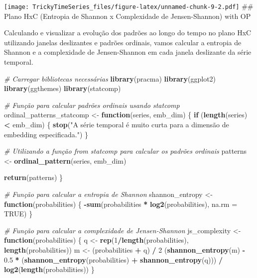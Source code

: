 \documentclass[
]{article}
\newenvironment{Shaded}{\begin{snugshade}}{\end{snugshade}}
\newcommand{\AttributeTok}[1]{\textcolor[rgb]{0.13,0.29,0.53}{#1}}
\newcommand{\CommentTok}[1]{\textcolor[rgb]{0.56,0.35,0.01}{\textit{#1}}}
\newcommand{\ConstantTok}[1]{\textcolor[rgb]{0.56,0.35,0.01}{#1}}
\newcommand{\ControlFlowTok}[1]{\textcolor[rgb]{0.13,0.29,0.53}{\textbf{#1}}}
\newcommand{\DecValTok}[1]{\textcolor[rgb]{0.00,0.00,0.81}{#1}}
\newcommand{\FloatTok}[1]{\textcolor[rgb]{0.00,0.00,0.81}{#1}}
\newcommand{\FunctionTok}[1]{\textcolor[rgb]{0.13,0.29,0.53}{\textbf{#1}}}
\newcommand{\NormalTok}[1]{#1}
\newcommand{\OtherTok}[1]{\textcolor[rgb]{0.56,0.35,0.01}{#1}}
\newcommand{\SpecialCharTok}[1]{\textcolor[rgb]{0.81,0.36,0.00}{\textbf{#1}}}
\newcommand{\StringTok}[1]{\textcolor[rgb]{0.31,0.60,0.02}{#1}}
\begin{document}
\texttt{[image: TrickyTimeSeries\_files/figure-latex/unnamed-chunk-9-2.pdf]}
\#\# Plano HxC (Entropia de Shannon x Complexidade de Jensen-Shannon)
with OP

Calculando e visualizar a evolução dos padrões ao longo do tempo no
plano HxC utilizando janelas deslizantes e padrões ordinais, vamos
calcular a entropia de Shannon e a complexidade de Jensen-Shannon em
cada janela deslizante da série temporal.

\begin{Shaded}
\begin{Highlighting}[]
\CommentTok{\# Carregar bibliotecas necessárias}
\FunctionTok{library}\NormalTok{(pracma)}
\FunctionTok{library}\NormalTok{(ggplot2)}
\FunctionTok{library}\NormalTok{(ggthemes)}
\FunctionTok{library}\NormalTok{(statcomp)}

\CommentTok{\# Função para calcular padrões ordinais usando statcomp}
\NormalTok{ordinal\_patterns\_statcomp }\OtherTok{\textless{}{-}} \ControlFlowTok{function}\NormalTok{(series, emb\_dim) \{}
  \ControlFlowTok{if}\NormalTok{ (}\FunctionTok{length}\NormalTok{(series) }\SpecialCharTok{\textless{}}\NormalTok{ emb\_dim) \{}
    \FunctionTok{stop}\NormalTok{(}\StringTok{"A série temporal é muito curta para a dimensão de embedding especificada."}\NormalTok{)}
\NormalTok{  \}}
  
  \CommentTok{\# Utilizando a função from \textasciigrave{}statcomp\textasciigrave{} para calcular os padrões ordinais}
\NormalTok{  patterns }\OtherTok{\textless{}{-}} \FunctionTok{ordinal\_pattern}\NormalTok{(series, emb\_dim)}
  
  \FunctionTok{return}\NormalTok{(patterns)}
\NormalTok{\}}

\CommentTok{\# Função para calcular a entropia de Shannon}
\NormalTok{shannon\_entropy }\OtherTok{\textless{}{-}} \ControlFlowTok{function}\NormalTok{(probabilities) \{}
  \SpecialCharTok{{-}}\FunctionTok{sum}\NormalTok{(probabilities }\SpecialCharTok{*} \FunctionTok{log2}\NormalTok{(probabilities), }\AttributeTok{na.rm =} \ConstantTok{TRUE}\NormalTok{)}
\NormalTok{\}}

\CommentTok{\# Função para calcular a complexidade de Jensen{-}Shannon}
\NormalTok{js\_complexity }\OtherTok{\textless{}{-}} \ControlFlowTok{function}\NormalTok{(probabilities) \{}
\NormalTok{  q }\OtherTok{\textless{}{-}} \FunctionTok{rep}\NormalTok{(}\DecValTok{1}\SpecialCharTok{/}\FunctionTok{length}\NormalTok{(probabilities), }\FunctionTok{length}\NormalTok{(probabilities))}
\NormalTok{  m }\OtherTok{\textless{}{-}}\NormalTok{ (probabilities }\SpecialCharTok{+}\NormalTok{ q) }\SpecialCharTok{/} \DecValTok{2}
\NormalTok{  (}\FunctionTok{shannon\_entropy}\NormalTok{(m) }\SpecialCharTok{{-}} \FloatTok{0.5} \SpecialCharTok{*}\NormalTok{ (}\FunctionTok{shannon\_entropy}\NormalTok{(probabilities) }\SpecialCharTok{+} \FunctionTok{shannon\_entropy}\NormalTok{(q))) }\SpecialCharTok{/} \FunctionTok{log2}\NormalTok{(}\FunctionTok{length}\NormalTok{(probabilities))}
\NormalTok{\}}


\end{Highlighting}
\end{Shaded}
\end{document}
